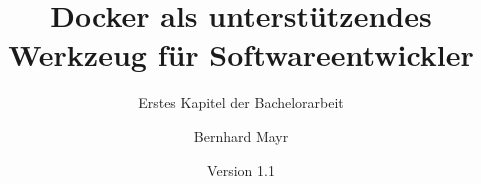 \documentclass[a4paper, ngerman, bibliography=totoc]{scrreprt}  %
\title{Docker als unterstützendes Werkzeug für Softwareentwickler}
\subtitle{Erstes Kapitel der Bachelorarbeit}
\author{Bernhard Mayr}
\date{Version 1.1}
\begin{document}
\maketitle


\tableofcontents






\listoffigures{}
\lstlistoflistings{}
\printbibliography{}
\end{document}
